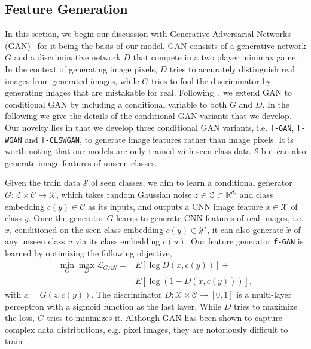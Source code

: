 \documentclass[10pt,twocolumn,letterpaper]{article}
\newcommand{\myparagraph}[1]{\vspace{6pt}\noindent{\bf #1}}
\begin{document}
\subsection{Feature Generation}
\label{sec:GAN}
In this section, we begin our discussion with Generative Adversarial Networks (GAN)~\cite{GPMXWDOCB14} for it being the basis of our model. GAN consists of a generative network $G$ and a discriminative network $D$ that compete in a two player minimax game. In the context of generating image pixels, $D$ tries to accurately distinguish real images from generated images, while $G$ tries to fool the discriminator by generating images that are mistakable for real. Following~\cite{conditionalgans}, we extend GAN to  conditional GAN by including a conditional variable to both $G$ and $D$. In the following we give the details of the conditional GAN variants that we develop. Our novelty lies in that we develop three conditional GAN variants, i.e. \texttt{f-GAN}, \texttt{f-WGAN} and \texttt{f-CLSWGAN}, to generate image features rather than image pixels. It is worth noting that our models are only trained with seen class data $\mathcal{S}$ but can also generate image features of unseen classes. 

 






\myparagraph{\texttt{f-GAN}.} Given the train data $\mathcal{S}$ of seen classes, we aim to learn a conditional generator $G:\mathcal{Z} \times \mathcal{C}\rightarrow \mathcal{X}$, which takes random Gaussian noise $z\in \mathcal{Z} \subset \mathbb{R}^{d_z}$ and class embedding $c(y) \in \mathcal{C}$ as its inputs, and outputs a CNN image feature $\tilde{x} \in \mathcal{X}$ of class $y$. Once the generator $G$ learns to generate CNN features of real images, i.e. $x$, conditioned on the seen class embedding $c(y) \in \mathcal{Y}^s$, it can also generate $\tilde{x}$ of any unseen class $u$ via its class embedding $c(u)$. 
Our feature generator \texttt{f-GAN} is learned by optimizing the following objective,
\begin{align}
\label{eq:gan}
\min_G \max_D \mathcal{L}_{GAN} =& E[\log D(x,c(y))] + \\
        & E[\log \left(1-D(\tilde{x},c(y))\right)],  \nonumber
\end{align}
with $\tilde{x}=G(z, c(y))$. The discriminator $D: \mathcal{X} \times \mathcal{C} \rightarrow [0, 1]$ is a multi-layer perceptron with a sigmoid function as the last layer. While $D$ tries to maximize the loss, $G$ tries to minimizes it. Although GAN has been shown to capture complex data distributions, e.g. pixel images, they are notoriously difficult to train~\cite{arjovsky2017towards}.
\end{document}
